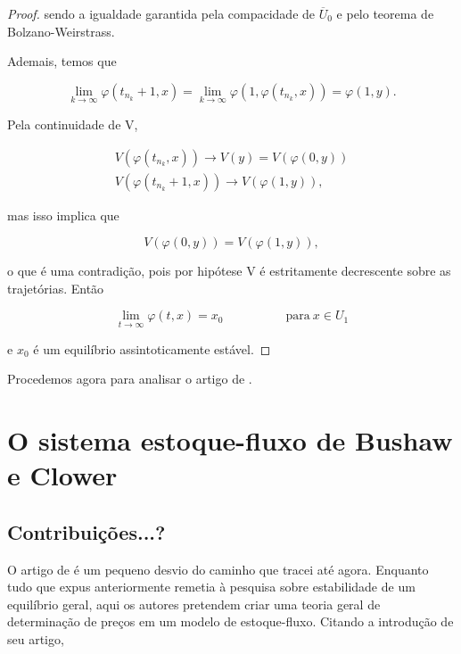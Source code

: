 \documentclass[
	12pt,				%
	openright,			%
	twoside,			%
	a4paper,			%
	english,			%
	french,				%
	spanish,			%
	brazil				%
	]{abntex2}
\newcommand{\espaco}{\hspace{5em}}
\newcommand{\Fi}{\varphi}
\newcommand{\Ubarrao}{\overline{U}_0}
\begin{document}
\begin{proof}
	sendo a igualdade garantida pela compacidade de $\Ubarrao$ e pelo teorema de
	Bolzano-Weirstrass.

	Ademais, temos que

	\begin{equation*}
		\lim_{k \to \infty} \Fi(t_{n_k} + 1, x) = \lim_{k \to \infty} \Fi(1, \Fi(t_{n_k}, x)) = \Fi(1, y).
	\end{equation*}

	Pela continuidade de V,

	\begin{equation*}
		\begin{matrix}
			V(\Fi(t_{n_k}, x)) \to V(y) = V(\Fi(0, y)) \\
			V(\Fi(t_{n_k} + 1, x)) \to V(\Fi(1, y)),
		\end{matrix}
	\end{equation*}

	mas isso implica que

	\begin{equation*}
		V(\Fi(0, y)) = V(\Fi(1, y)),
	\end{equation*}

	o que é uma contradição, pois por hipótese V é estritamente decrescente sobre
	as trajetórias. Então

	\begin{equation*}
		\lim_{t \to \infty} \Fi(t, x) = x_0 \espaco \text{para} \ x \in U_1
	\end{equation*}

	e $x_0$ é um equilíbrio assintoticamente estável.

\end{proof}

	Procedemos agora para analisar o artigo de .

\chapter{O sistema estoque-fluxo de Bushaw e Clower}

\section{Contribuições...?}

O artigo de  é um pequeno desvio do caminho que
tracei até agora. Enquanto tudo que expus anteriormente remetia à pesquisa sobre estabilidade
de um equilíbrio geral, aqui os autores pretendem criar uma teoria geral de determinação
de preços em um modelo de estoque-fluxo. Citando a introdução de seu artigo,
\end{document}
